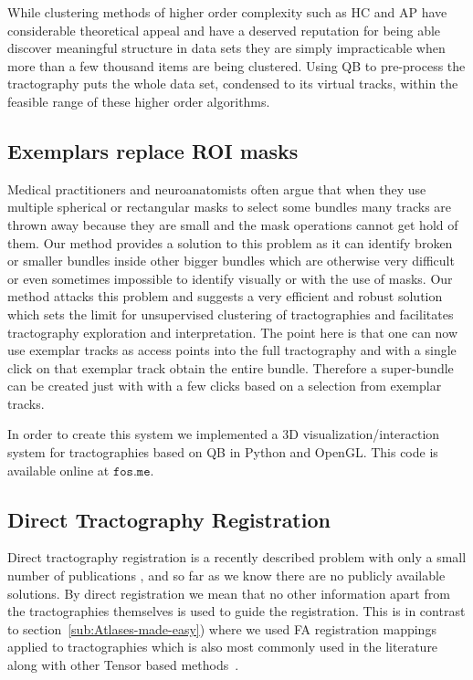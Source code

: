 \documentclass{bioinfo}
\begin{document}
While clustering methods of higher order complexity such as HC and AP
have considerable theoretical appeal and have a deserved reputation for
being able discover meaningful structure in data sets they are simply
impracticable when more than a few thousand items are being
clustered. Using QB to pre-process the tractography puts the whole data
set, condensed to its virtual tracks, within the feasible range of these
higher order algorithms.

\subsection{Exemplars replace ROI masks\label{sub:exemplars_vs_ROIs}}

Medical practitioners and neuroanatomists often argue that when they use
multiple spherical or rectangular masks to select some bundles many
tracks are thrown away because they are small and the mask operations
cannot get hold of them. Our method provides a solution to this problem
as it can identify broken or smaller bundles inside other bigger bundles
which are otherwise very difficult or even sometimes impossible to
identify visually or with the use of masks. Our method attacks this
problem and suggests a very efficient and robust solution which sets the
limit for unsupervised clustering of tractographies and facilitates
tractography exploration and interpretation. The point here is that one
can now use exemplar tracks as access points into the full tractography
and with a single click on that exemplar track obtain the entire bundle.
Therefore a super-bundle can be created just with with a few clicks
based on a selection from exemplar tracks.

In order to create this system we implemented a 3D
visualization/interaction system for tractographies based on QB in
Python and OpenGL. This code is available online at $\texttt{fos.me}$.


\subsection{Direct Tractography Registration\label{sub:direct_registration}}

Direct tractography registration is a recently described problem with
only a small number of publications \citep{leemans2006multiscale,
  mayer2008bundles, mayerdirect, mayer2011supervised,
  durrleman2010registration, zvitia2008adaptive, Zvitia2010,
  ZiyanMICCAI07}, and so far as we know there are no publicly available
solutions. By direct registration we mean that no other information
apart from the tractographies themselves is used to guide the
registration. This is in contrast to
section~\ref{sub:Atlases-made-easy}) where we used FA registration
mappings applied to tractographies which is also most commonly used in
the literature along with other Tensor based
methods~\cite{goh2006algebraic}.
\end{document}
